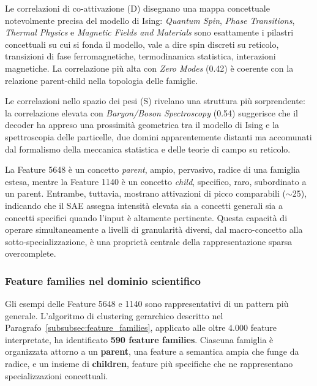 
Le correlazioni di co-attivazione (D) disegnano una mappa concettuale notevolmente precisa del modello di Ising: \textit{Quantum Spin}, \textit{Phase Transitions}, \textit{Thermal Physics} e \textit{Magnetic Fields and Materials} sono esattamente i pilastri concettuali su cui si fonda il modello, vale a dire spin discreti su reticolo, transizioni di fase ferromagnetiche, termodinamica statistica, interazioni magnetiche. La correlazione più alta con \textit{Zero Modes} (0.42) è coerente con la relazione parent-child nella topologia delle famiglie.

Le correlazioni nello spazio dei pesi (S) rivelano una struttura più sorprendente: la correlazione elevata con \textit{Baryon/Boson Spectroscopy} (0.54) suggerisce che il decoder ha appreso una prossimità geometrica tra il modello di Ising e la spettroscopia delle particelle, due domini apparentemente distanti ma accomunati dal formalismo della meccanica statistica e delle teorie di campo su reticolo.

La Feature 5648 è un concetto \textit{parent}, ampio, pervasivo, radice di una famiglia estesa, mentre la Feature 1140 è un concetto \textit{child}, specifico, raro, subordinato a un parent. Entrambe, tuttavia, mostrano attivazioni di picco comparabili ($\sim$25), indicando che il SAE assegna intensità elevata sia a concetti generali sia a concetti specifici quando l'input è altamente pertinente. Questa capacità di operare simultaneamente a livelli di granularità diversi, dal macro-concetto alla sotto-specializzazione, è una proprietà centrale della rappresentazione sparsa overcomplete.

\subsubsection{Feature families nel dominio scientifico}
\label{subsubsec:scientific_features}
Gli esempi delle Feature 5648 e 1140 sono rappresentativi di un pattern più generale. L'algoritmo di clustering gerarchico descritto nel Paragrafo~\ref{subsubsec:feature_families}, applicato alle oltre 4.000 feature interpretate, ha identificato \textbf{590 feature families}. Ciascuna famiglia è organizzata attorno a un \textbf{parent}, una feature a semantica ampia che funge da radice, e un insieme di \textbf{children}, feature più specifiche che ne rappresentano specializzazioni concettuali.


